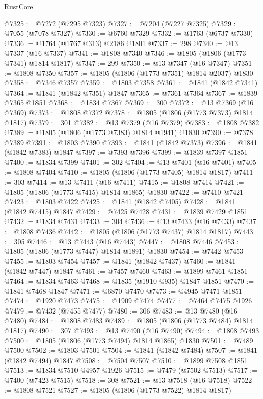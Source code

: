 \begin{lexlean}{RustCore}
\begin{coremodule}
@7325 := @7272 (@7295 @7323)
@7327 := @7204 (@7227 @7325)
@7329 := @7055 (@7078 @7327)
@7330 := @6760 @7329
@7332 := @1763 (@6737 @7330)
@7336 := @1764 (@1767 @313) @2186 @1801
@7337 := 298
@7340 := @13 @7337 (@16 @7337)
@7341 := @1808 @7340
@7346 := @1805 (@1806 (@1773 @7341) @1814 @1817)
@7347 := 299
@7350 := @13 @7347 (@16 @7347)
@7351 := @1808 @7350
@7357 := @1805 (@1806 (@1773 @7351) @1814 @2037) @1830
@7358 := @7346 @7357
@7359 := @1803 @7358
@7361 := @1841 (@1842 @7341)
@7364 := @1841 (@1842 @7351) @1847
@7365 := @7361 @7364
@7367 := @1839 @7365 @1851
@7368 := @1834 @7367
@7369 := 300
@7372 := @13 @7369 (@16 @7369)
@7373 := @1808 @7372
@7378 := @1805 (@1806 (@1773 @7373) @1814 @1817)
@7379 := 301
@7382 := @13 @7379 (@16 @7379)
@7383 := @1808 @7382
@7389 := @1805 (@1806 (@1773 @7383) @1814 @1941) @1830
@7390 := @7378 @7389
@7391 := @1803 @7390
@7393 := @1841 (@1842 @7373)
@7396 := @1841 (@1842 @7383) @1847
@7397 := @7393 @7396
@7399 := @1839 @7397 @1851
@7400 := @1834 @7399
@7401 := 302
@7404 := @13 @7401 (@16 @7401)
@7405 := @1808 @7404
@7410 := @1805 (@1806 (@1773 @7405) @1814 @1817)
@7411 := 303
@7414 := @13 @7411 (@16 @7411)
@7415 := @1808 @7414
@7421 := @1805 (@1806 (@1773 @7415) @1814 @1865) @1830
@7422 := @7410 @7421
@7423 := @1803 @7422
@7425 := @1841 (@1842 @7405)
@7428 := @1841 (@1842 @7415) @1847
@7429 := @7425 @7428
@7431 := @1839 @7429 @1851
@7432 := @1834 @7431
@7433 := 304
@7436 := @13 @7433 (@16 @7433)
@7437 := @1808 @7436
@7442 := @1805 (@1806 (@1773 @7437) @1814 @1817)
@7443 := 305
@7446 := @13 @7443 (@16 @7443)
@7447 := @1808 @7446
@7453 := @1805 (@1806 (@1773 @7447) @1814 @1891) @1830
@7454 := @7442 @7453
@7455 := @1803 @7454
@7457 := @1841 (@1842 @7437)
@7460 := @1841 (@1842 @7447) @1847
@7461 := @7457 @7460
@7463 := @1899 @7461 @1851
@7464 := @1834 @7463
@7468 := @1835 (@1910 @935) @1847 @1851
@7470 := @1841 @7468 @1847
@7471 := @6870 @7470
@7473 := @4945 @7471 @1851
@7474 := @1920 @7473
@7475 := @1909 @7474
@7477 := @7464 @7475 @1926
@7479 := @7432 (@7455 @7477)
@7480 := 306
@7483 := @13 @7480 (@16 @7480)
@7484 := @1808 @7483
@7489 := @1805 (@1806 (@1773 @7484) @1814 @1817)
@7490 := 307
@7493 := @13 @7490 (@16 @7490)
@7494 := @1808 @7493
@7500 := @1805 (@1806 (@1773 @7494) @1814 @1865) @1830
@7501 := @7489 @7500
@7502 := @1803 @7501
@7504 := @1841 (@1842 @7484)
@7507 := @1841 (@1842 @7494) @1847
@7508 := @7504 @7507
@7510 := @1899 @7508 @1851
@7513 := @1834 @7510 @4957 @1926
@7515 := @7479 (@7502 @7513)
@7517 := @7400 (@7423 @7515)
@7518 := 308
@7521 := @13 @7518 (@16 @7518)
@7522 := @1808 @7521
@7527 := @1805 (@1806 (@1773 @7522) @1814 @1817)

\end{coremodule}
\end{lexlean}
